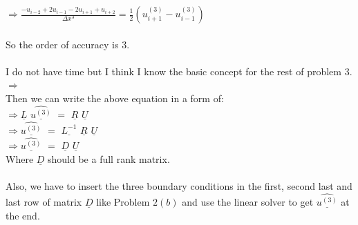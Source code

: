 \documentclass[12pt]{article}
\newenvironment{problem}[2][Problem]{\begin{trivlist}
\item[\hskip \labelsep {\bfseries #1}\hskip \labelsep {\bfseries #2.}]}{\end{trivlist}}
\begin{document}
\begin{problem}{3}
$\Rightarrow \frac{-u_{i-2} + 2u_{i-1}  -2u_{i+1} + u_{i+2}}{\Delta x^3} = \frac{1}{2}(u_{i+1}^{(3)} - u_{i-1}^{(3)})$\\
\\
So the order of accuracy is 3.\\
\\
I do not have time but I think I know the basic concept for the rest of problem 3.\\
$\Rightarrow$\\
Then we can write the above equation in a form of:\\
$\Rightarrow \underline{L}$ $\underline{\hat{u^{(3)}}}$ $=$ $\underline{R}$ $\underline{U}$\\
$\Rightarrow \underline{\hat{u^{(3)}}}$ $=$ $\underline{L^{-1}}$ $\underline{R}$  $\underline{U}$\\
$\Rightarrow \underline{\hat{u^{(3)}}}$ $=$ $\underline{D}$ $\underline{U}$\\
Where $\underline{D}$ should be a full rank matrix.\\
\\
Also, we have to insert the three boundary conditions in the first, second last and last row of matrix $\underline{D}$ like Problem $2(b)$ and use the linear solver to get $\underline{\hat{u^{(3)}}}$ at the end.\\

\end{problem}
\end{document}

